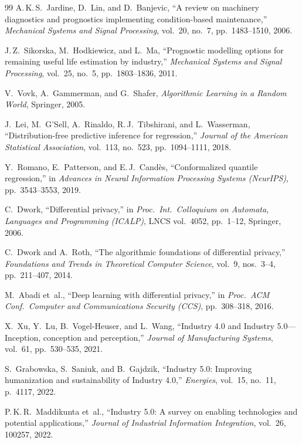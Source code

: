 \documentclass[10pt, journal, letterpaper]{IEEEtran}
\begin{document}
\begin{thebibliography}{99}
A.\,K.\,S.~Jardine, D.~Lin, and D.~Banjevic,
``A review on machinery diagnostics and prognostics implementing
condition-based maintenance,''
\emph{Mechanical Systems and Signal Processing}, vol.~20, no.~7,
pp.~1483--1510, 2006.

J.\,Z.~Sikorska, M.~Hodkiewicz, and L.~Ma,
``Prognostic modelling options for remaining useful life estimation by
industry,''
\emph{Mechanical Systems and Signal Processing}, vol.~25, no.~5,
pp.~1803--1836, 2011.

V.~Vovk, A.~Gammerman, and G.~Shafer,
\emph{Algorithmic Learning in a Random World}, Springer, 2005.

J.~Lei, M.~G'Sell, A.~Rinaldo, R.\,J.~Tibshirani, and L.~Wasserman,
``Distribution-free predictive inference for regression,''
\emph{Journal of the American Statistical Association},
vol.~113, no.~523, pp.~1094--1111, 2018.

Y.~Romano, E.~Patterson, and E.\,J.~Cand\`{e}s,
``Conformalized quantile regression,''
in \emph{Advances in Neural Information Processing Systems (NeurIPS)},
pp.~3543--3553, 2019.

C.~Dwork,
``Differential privacy,''
in \emph{Proc.\ Int.\ Colloquium on Automata, Languages and Programming
(ICALP)}, LNCS vol.~4052, pp.~1--12, Springer, 2006.

C.~Dwork and A.~Roth,
``The algorithmic foundations of differential privacy,''
\emph{Foundations and Trends in Theoretical Computer Science},
vol.~9, nos.~3--4, pp.~211--407, 2014.

M.~Abadi et~al.,
``Deep learning with differential privacy,''
in \emph{Proc.\ ACM Conf.\ Computer and Communications Security (CCS)},
pp.~308--318, 2016.

X.~Xu, Y.~Lu, B.~Vogel-Heuser, and L.~Wang,
``Industry 4.0 and Industry 5.0---Inception, conception and perception,''
\emph{Journal of Manufacturing Systems}, vol.~61, pp.~530--535, 2021.

S.~Grabowska, S.~Saniuk, and B.~Gajdzik,
``Industry 5.0: Improving humanization and sustainability of Industry 4.0,''
\emph{Energies}, vol.~15, no.~11, p.~4117, 2022.

P.\,K.\,R.~Maddikunta et~al.,
``Industry 5.0: A survey on enabling technologies and potential
applications,''
\emph{Journal of Industrial Information Integration},
vol.~26, 100257, 2022.

\end{thebibliography}
\end{document}
